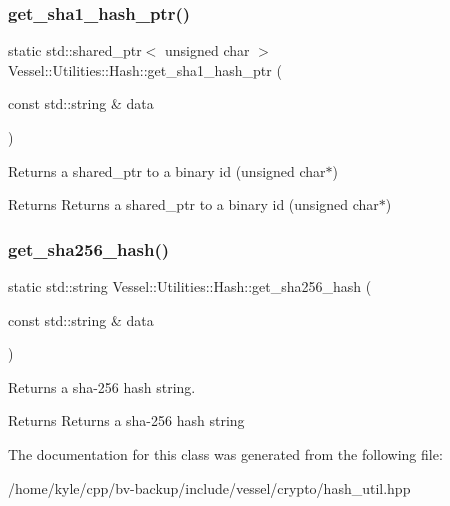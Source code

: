\subsubsection{\texorpdfstring{get\+\_\+sha1\+\_\+hash\+\_\+ptr()}{get\_sha1\_hash\_ptr()}}
{\footnotesize\ttfamily static std\+::shared\+\_\+ptr$<$ unsigned char $>$ Vessel\+::\+Utilities\+::\+Hash\+::get\+\_\+sha1\+\_\+hash\+\_\+ptr (\begin{DoxyParamCaption}\item[{const std\+::string \&}]{data }\end{DoxyParamCaption})\hspace{0.3cm}{\ttfamily [static]}}



Returns a shared\+\_\+ptr to a binary id (unsigned char$\ast$) 

\begin{DoxyReturn}{Returns}
Returns a shared\+\_\+ptr to a binary id (unsigned char$\ast$) 
\end{DoxyReturn}
\mbox{\label{class_vessel_1_1_utilities_1_1_hash_ac2947d4601160bd693f94fbb03a567c2}} 
\subsubsection{\texorpdfstring{get\+\_\+sha256\+\_\+hash()}{get\_sha256\_hash()}}
{\footnotesize\ttfamily static std\+::string Vessel\+::\+Utilities\+::\+Hash\+::get\+\_\+sha256\+\_\+hash (\begin{DoxyParamCaption}\item[{const std\+::string \&}]{data }\end{DoxyParamCaption})\hspace{0.3cm}{\ttfamily [static]}}



Returns a sha-\/256 hash string. 

\begin{DoxyReturn}{Returns}
Returns a sha-\/256 hash string 
\end{DoxyReturn}


The documentation for this class was generated from the following file\+:\begin{DoxyCompactItemize}
\item 
/home/kyle/cpp/bv-\/backup/include/vessel/crypto/hash\+\_\+util.\+hpp\end{DoxyCompactItemize}
